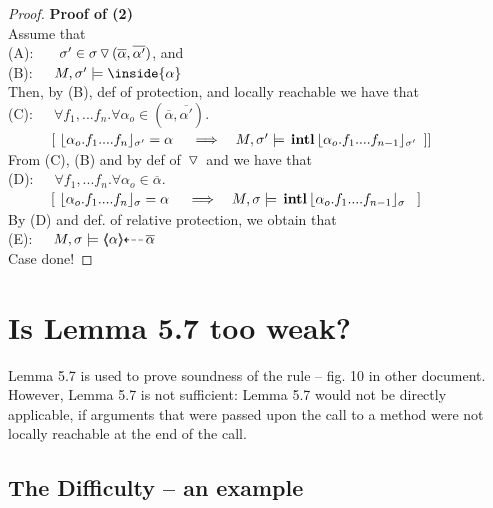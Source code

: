 \begin{proof}
\vspace{.2cm}
\noindent
\textbf{Proof of (2)}\\
Assume that\\
(A): \ \ \ $\sigma' \in  \sigma \, {\triangledown}\, (\overline \alpha, \overline {\alpha'})$, and \\
(B):\ \ \  $M,  \sigma' \models \inside {\alpha}$\\
Then, by  (B), def of protection, and locally reachable  we have that
\\
(C):\ \ \ $\forall  f_1, ... f_n. \forall \alpha_o \in (\overline \alpha, \overline {\alpha'}).$\\
$\strut \ \ \ \ \ \ \ \ \  [\ {\interpret {\sigma'} {\alpha_o.f_1....f_n}} =\alpha\ 
 \ \ \    \Longrightarrow  \ \ \   M, \sigma' \models \internal {\interpret {\sigma'} {\alpha_o.f_1....f_{n-1}}}\ ] ]$
\\
From (C), (B) and by def of $\, {\triangledown}\,$ and we have that
\\
(D):\ \ \ $\forall  f_1, ... f_n. \forall \alpha_o \in \overline \alpha.$ \\
$\strut \ \ \ \ \ \ \ \ \  [\ {\interpret {\sigma} {\alpha_o.f_1....f_n}} =\alpha\ 
 \ \ \    \Longrightarrow  \ \ \   M, \sigma \models \internal {\interpret {\sigma} {\alpha_o.f_1....f_{n-1}}}\ \ ]$
\\
By (D) and def. of relative protection, we obtain that\\
(E):\ \ \ $M, \sigma \models \langle\!\!\langle \alpha \rangle\!\!\rangle\!\!\dashleftarrow\! \overline {\alpha} $
\\
Case done!
\end{proof}

\section{Is Lemma 5.7 too weak?}

Lemma 5.7 is used to prove soundness of the rule {} -- fig. 10 in other document. 
However, Lemma 5.7  is not sufficient:
Lemma 5.7 would not be directly applicable, if arguments that were passed upon the call to a method were not locally reachable at the end of the call.

\subsection{The Difficulty -- an example}

